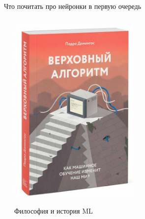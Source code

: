 \documentclass[notes,12pt, aspectratio=169]{beamer}
\begin{document}
\begin{frame}{Что почитать про нейронки в первую очередь}
\begin{columns}
\begin{column}{0.5\textwidth}
	\end{column}
	\begin{column}{0.5\textwidth}
		\begin{center}
			\includegraphics[width=0.5\textwidth]{book2.jpg} 
			
			\footnotesize Философия и история ML
		\end{center}
	\end{column}
\end{columns}
\end{frame} 
\end{document}
